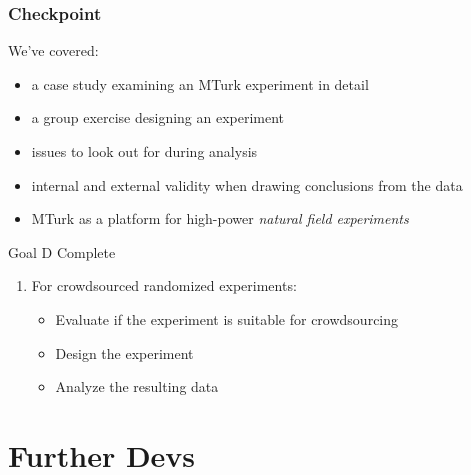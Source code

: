 \documentclass[slides]{beamer} %
\begin{document}
\begin{frame}\frametitle{Checkpoint}

We've covered:

\begin{itemize}
\item a case study examining an MTurk experiment in detail \pause
\item a group exercise designing an experiment \pause
\item issues to look out for during analysis \pause
\item internal and external validity when drawing conclusions from the data \pause
\item MTurk as a platform for high-power \textit{natural field experiments} \pause
\end{itemize}

\begin{block}{Goal D Complete}
\small
\begin{enumerate}
\item[D] For crowdsourced randomized experiments:
\begin{itemize}
\item Evaluate if the experiment is suitable for crowdsourcing
\item Design the experiment
\item Analyze the resulting data
\end{itemize}
\end{enumerate}
\end{block}

\end{frame}

\section{Further Devs}
\end{document}
